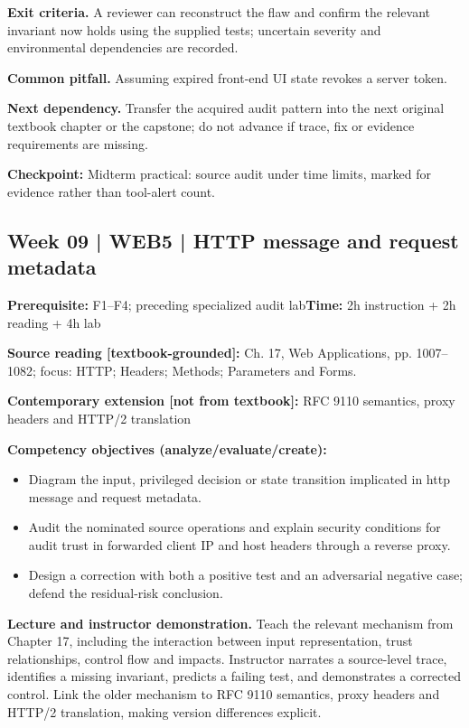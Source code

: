 \documentclass[10pt,letterpaper]{article}
\begin{document}
\textbf{Exit criteria.} A reviewer can reconstruct the flaw and confirm the relevant invariant now holds using the supplied tests; uncertain severity and environmental dependencies are recorded.

\textbf{Common pitfall.} Assuming expired front-end UI state revokes a server token.

\textbf{Next dependency.} Transfer the acquired audit pattern into the next original textbook chapter or the capstone; do not advance if trace, fix or evidence requirements are missing.

\begin{historynote}\textbf{Checkpoint:} Midterm practical: source audit under time limits, marked for evidence rather than tool-alert count.\end{historynote}
\subsection{Week 09 | WEB5 | HTTP message and request metadata}
\textbf{Prerequisite:} F1--F4; preceding specialized audit lab\hfill\textbf{Time:} 2h instruction + 2h reading + 4h lab

\textbf{Source reading [textbook-grounded]:} Ch. 17, Web Applications, pp. 1007--1082; focus: HTTP; Headers; Methods; Parameters and Forms.

\textbf{Contemporary extension [not from textbook]:} RFC 9110 semantics, proxy headers and HTTP/2 translation

\textbf{Competency objectives (analyze/evaluate/create):}
\begin{itemize}[leftmargin=*,itemsep=2pt]
\item Diagram the input, privileged decision or state transition implicated in http message and request metadata.
\item Audit the nominated source operations and explain security conditions for audit trust in forwarded client IP and host headers through a reverse proxy.
\item Design a correction with both a positive test and an adversarial negative case; defend the residual-risk conclusion.
\end{itemize}
\textbf{Lecture and instructor demonstration.} Teach the relevant mechanism from Chapter 17, including the interaction between input representation, trust relationships, control flow and impacts. Instructor narrates a source-level trace, identifies a missing invariant, predicts a failing test, and demonstrates a corrected control. Link the older mechanism to RFC 9110 semantics, proxy headers and HTTP/2 translation, making version differences explicit.
\end{document}

